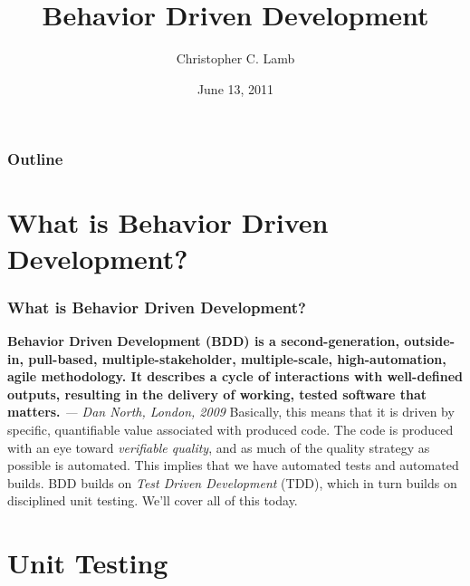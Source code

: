 \documentclass[t, 10pt]{beamer}
\title{Behavior Driven Development}
\author [Chris]{Christopher C. Lamb}
\institute[University of New Mexico]{
\inst {}Department of Electrical and Computer Engineering\\
University of New Mexico}
\date{June 13, 2011}
\begin{document}
\begin{frame}
\titlepage
\end{frame}


\begin{frame}
\frametitle{Outline}
\tableofcontents 
\end{frame}

\section{What is Behavior Driven Development?}

\begin{frame}
\frametitle{What is Behavior Driven Development?}
\textbf{Behavior Driven Development (BDD) is a second-generation, outside-in, pull-based, multiple-stakeholder, multiple-scale, high-automation, agile methodology. It describes a cycle of interactions with well-defined outputs, resulting in the delivery of working, tested software that matters.}
\newline
\textit{--- Dan North, London, 2009}
\newline
\newline
\newline
Basically, this means that it is driven by specific, quantifiable value associated with produced code.  The code is produced with an eye toward \textit{verifiable quality}, and as much of the quality strategy as possible is automated.  This implies that we have automated tests and automated builds.  BDD builds on \textit{Test Driven Development} (TDD), which in turn builds on disciplined unit testing.  We'll cover all of this today.
\end{frame}

\section{Unit Testing}
\end{document}
